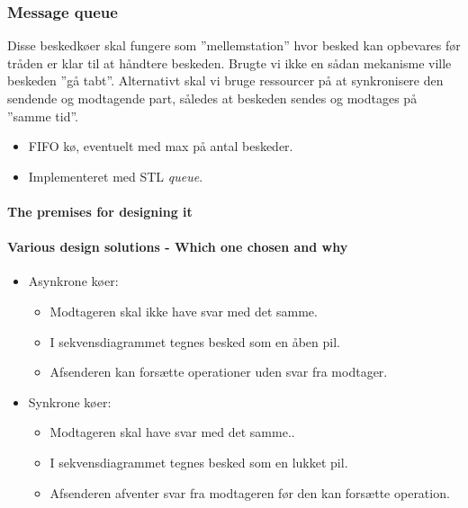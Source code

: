 \subsubsection{Message queue}
Disse beskedkøer skal fungere som ''mellemstation'' hvor besked kan opbevares før tråden er klar til at håndtere beskeden. Brugte vi ikke en sådan mekanisme ville beskeden ''gå tabt''. Alternativt skal vi bruge ressourcer på at synkronisere den sendende og modtagende part, således at beskeden sendes og modtages på ''samme tid''.


\begin{itemize}
	\item FIFO kø, eventuelt med max på antal beskeder.
	\item Implementeret med STL \textit{queue}.
\end{itemize}

\paragraph{The premises for designing it}

\paragraph{Various design solutions - Which one chosen and why}

\begin{itemize}
	\item Asynkrone køer:
	\begin{itemize}
		\item Modtageren skal ikke have svar med det samme.
		\item I sekvensdiagrammet tegnes besked som en åben pil.  
		\item Afsenderen kan forsætte operationer uden svar fra modtager.
	\end{itemize}
	\item Synkrone køer:
	\begin{itemize}
		\item Modtageren skal have svar med det samme..
		\item I sekvensdiagrammet tegnes besked som en lukket pil. 
		\item Afsenderen afventer svar fra modtageren før den kan forsætte operation.
	\end{itemize}
\end{itemize}

